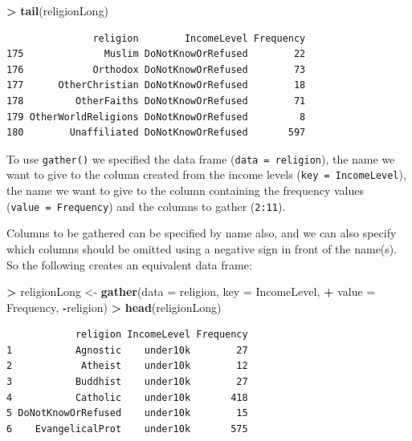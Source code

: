 \documentclass[]{krantz}
\makeatletter
\newenvironment{Shaded}{\begin{snugshade}}{\end{snugshade}}
\newcommand{\KeywordTok}[1]{\textcolor[rgb]{0.27,0.27,0.27}{\textbf{#1}}}
\newcommand{\DataTypeTok}[1]{\textcolor[rgb]{0.27,0.27,0.27}{#1}}
\newcommand{\StringTok}[1]{\textcolor[rgb]{0.5,0.5,0.5}{#1}}
\newcommand{\OperatorTok}[1]{\textcolor[rgb]{0.43,0.43,0.43}{\textbf{#1}}}
\newcommand{\NormalTok}[1]{#1}
\newenvironment{kframe}{%
\medskip{}
\setlength{\fboxsep}{.8em}
 \def\at@end@of@kframe{}%
 \ifinner\ifhmode%
  \def\at@end@of@kframe{\end{minipage}}%
  \begin{minipage}{\columnwidth}%
 \fi\fi%
 \def\FrameCommand##1{\hskip\@totalleftmargin \hskip-\fboxsep
 \colorbox{shadecolor}{##1}\hskip-\fboxsep
     \hskip-\linewidth \hskip-\@totalleftmargin \hskip\columnwidth}%
 \MakeFramed {\advance\hsize-\width
   \@totalleftmargin\z@ \linewidth\hsize
   \@setminipage}}%
 {\par\unskip\endMakeFramed%
 \at@end@of@kframe}
\renewenvironment{Shaded}{\begin{kframe}}{\end{kframe}}
\makeatother
\begin{document}
\begin{Shaded}
\begin{Highlighting}[]
\OperatorTok{>}\StringTok{ }\KeywordTok{tail}\NormalTok{(religionLong)}
\end{Highlighting}
\end{Shaded}

\begin{verbatim}
               religion        IncomeLevel Frequency
175              Muslim DoNotKnowOrRefused        22
176            Orthodox DoNotKnowOrRefused        73
177      OtherChristian DoNotKnowOrRefused        18
178         OtherFaiths DoNotKnowOrRefused        71
179 OtherWorldReligions DoNotKnowOrRefused         8
180        Unaffiliated DoNotKnowOrRefused       597
\end{verbatim}

To use \texttt{gather()} we specified the data frame
(\texttt{data\ =\ religion}), the name we want to give to the column
created from the income levels (\texttt{key\ =\ IncomeLevel}), the name
we want to give to the column containing the frequency values
(\texttt{value\ =\ Frequency}) and the columns to gather
(\texttt{2:11}).

Columns to be gathered can be specified by name also, and we can also
specify which columns should be omitted using a negative sign in front
of the name(s). So the following creates an equivalent data frame:

\begin{Shaded}
\begin{Highlighting}[]
\OperatorTok{>}\StringTok{ }\NormalTok{religionLong <-}\StringTok{ }\KeywordTok{gather}\NormalTok{(}\DataTypeTok{data =}\NormalTok{ religion, }\DataTypeTok{key =}\NormalTok{ IncomeLevel, }
\OperatorTok{+}\StringTok{                        }\DataTypeTok{value =}\NormalTok{ Frequency, }\OperatorTok{-}\NormalTok{religion)}
\OperatorTok{>}\StringTok{ }\KeywordTok{head}\NormalTok{(religionLong)}
\end{Highlighting}
\end{Shaded}

\begin{verbatim}
            religion IncomeLevel Frequency
1           Agnostic    under10k        27
2            Atheist    under10k        12
3           Buddhist    under10k        27
4           Catholic    under10k       418
5 DoNotKnowOrRefused    under10k        15
6    EvangelicalProt    under10k       575
\end{verbatim}
\end{document}

